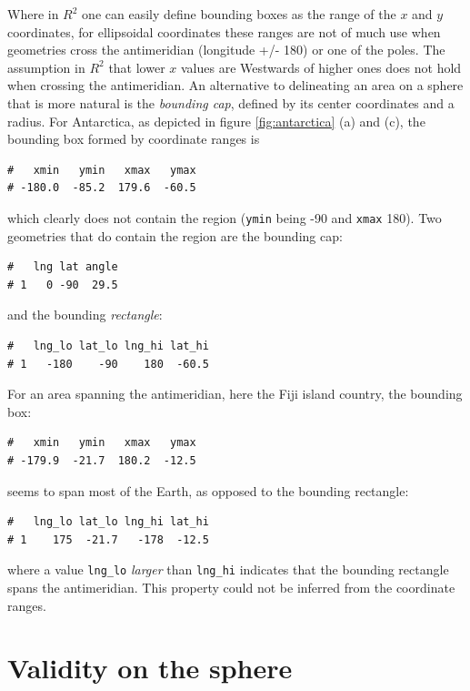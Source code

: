 \documentclass[]{book}
\begin{document}
Where in \(R^2\) one can easily define bounding boxes as the range
of the \(x\) and \(y\) coordinates, for ellipsoidal coordinates these
ranges are not of much use when geometries cross the antimeridian
(longitude +/- 180) or one of the poles. The assumption in \(R^2\)
that lower \(x\) values are Westwards of higher ones does not hold
when crossing the antimeridian. An alternative to delineating
an area on a sphere that is more natural is the \emph{bounding cap},
defined by its center coordinates and a radius. For Antarctica,
as depicted in figure \ref{fig:antarctica} (a) and (c), the
bounding box formed by coordinate ranges is

\begin{verbatim}
#   xmin   ymin   xmax   ymax 
# -180.0  -85.2  179.6  -60.5
\end{verbatim}

which clearly does not contain the region (\texttt{ymin} being -90 and \texttt{xmax} 180).
Two geometries that do contain the region are the bounding cap:

\begin{verbatim}
#   lng lat angle
# 1   0 -90  29.5
\end{verbatim}

and the bounding \emph{rectangle}:

\begin{verbatim}
#   lng_lo lat_lo lng_hi lat_hi
# 1   -180    -90    180  -60.5
\end{verbatim}

For an area spanning the antimeridian, here the Fiji island country,
the bounding box:

\begin{verbatim}
#   xmin   ymin   xmax   ymax 
# -179.9  -21.7  180.2  -12.5
\end{verbatim}

seems to span most of the Earth, as opposed to the bounding rectangle:

\begin{verbatim}
#   lng_lo lat_lo lng_hi lat_hi
# 1    175  -21.7   -178  -12.5
\end{verbatim}

where a value \texttt{lng\_lo} \emph{larger} than \texttt{lng\_hi} indicates that the
bounding rectangle spans the antimeridian. This property could not
be inferred from the coordinate ranges.

\hypertarget{validity-on-the-sphere}{%
\section{Validity on the sphere}\label{validity-on-the-sphere}}
\end{document}
